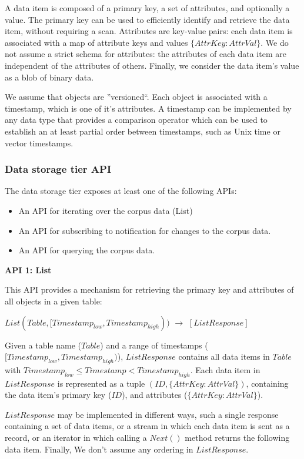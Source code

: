 A data item is composed of a primary key, a set of attributes, and optionally a value.
The primary key can be used to efficiently identify and retrieve the data item, without requiring a scan.
Attributes are key-value pairs: each data item is associated with a map of attribute keys and values
$\{AttrKey: AttrVal\}$.
We do not assume a strict schema for attributes: the attributes of each data item are independent of the attributes of
others.
Finally, we consider the data item's value as a blob of binary data.

We assume that objects are ''versioned``.
Each object is associated with a timestamp, which is one of it's attributes.
A timestamp can be implemented by any data type that provides a comparison operator which can be used to establish an
at least partial order between timestamps, such as Unix time or vector timestamps.

\subsubsection{Data storage tier API}

The data storage tier exposes at least one of the following APIs:
\begin{itemize}
  \item An API for iterating over the corpus data (List)
  \item An API for subscribing to notification for changes to the corpus data.
  \item An API for querying the corpus data.
\end{itemize}

\noindent
\textbf{API 1: List}

\noindent
This API provides a mechanism for retrieving the primary key and attributes of all objects in a given table:

$List(Table, [Timestamp_{low}, Timestamp_{high}))$ $\rightarrow$ $[ListResponse]$

\noindent
Given a table name ($Table$) and a range of timestamps ($[Timestamp_{low}, Timestamp_{high})$),
$ListResponse$ contains all data items in $Table$ with $Timestamp_{low} \leq Timestamp < Timestamp_{high}$.
Each data item in $ListResponse$ is represented as a tuple $(ID, \{AttrKey: AttrVal\})$, containing the data item's
primary key ($ID$), and attributes ($\{AttrKey: AttrVal\}$).

$ListResponse$ may be implemented in different ways, such a single response containing a set of
data items, or a stream in which each data item is sent as a record, or an iterator in which calling a $Next()$ method
returns the following data item.
Finally, We don't assume any ordering in $ListResponse$.

